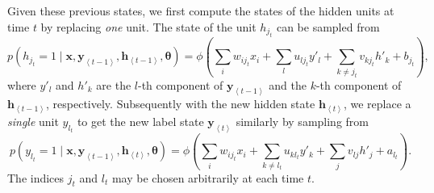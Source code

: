 \documentclass[dissertation,nocontribution]{aaltoseries}
\newcommand{\qt}[1]{\left<#1\right>}
\newcommand{\vect}[1]{\mathbf{#1}}
\newcommand{\vects}[1]{\boldsymbol{#1}}
\newcommand{\vh}[0]{\vect{h}}
\newcommand{\vx}[0]{\vect{x}}
\newcommand{\vy}[0]{\vect{y}}
\newcommand{\TT}[0]{{\vects{\theta}}}
\begin{document}
Given these previous states, we first compute the states of
the hidden units at time $t$ by replacing \textit{one} unit.
The state of the unit $h_{j_t}$ can be sampled from
\[
p(h_{j_t} = 1 \mid \vx, \vy_{\qt{t-1}}, \vh_{\qt{t-1}}, \TT) = \phi\left( 
\sum_{i} w_{i{j_t}} x_{i} 
+ \sum_{l} u_{l{j_t}} y'_{l} 
+ \sum_{k \neq {j_t}} v_{k{j_t}} h'_k 
+ b_{j_t} \right),
\]
where $y'_l$ and $h'_k$ are the $l$-th component of
$\vy_{\qt{t-1}}$ and the $k$-th component of $\vh_{\qt{t-1}}$,
respectively. Subsequently with the new hidden state
$\vh_{\qt{t}}$, we replace a \textit{single} unit $y_{l_t}$ to
get the new label state $\vy_{\qt{t}}$ similarly by sampling
from
\[
p(y_{l_t} = 1 \mid \vx, \vy_{\qt{t-1}}, \vh_{\qt{t}}, \TT) = \phi\left( 
\sum_{i} w_{i{j_t}} x_{i} 
+ \sum_{k \neq l_t} u_{k{l_t}} y'_{k} 
+ \sum_{j} v_{lj} h'_j 
+ a_{l_t} \right).
\]
The indices $j_t$ and $l_t$ may be chosen arbitrarily at
each time $t$. 
\end{document}
